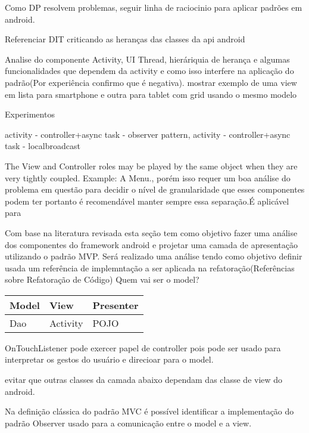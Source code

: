 
\if

Como DP resolvem problemas, seguir linha de raciocinio para aplicar padrões em
android.

Referenciar DIT criticando as heranças das classes da api android


Analise do componente Activity, UI Thread, hieráriquia de herança e algumas
funcionalidades que dependem da activity e como isso interfere na aplicação do
padrão(Por experiência confirmo que é negativa). mostrar exemplo de uma view em
lista para smartphone e outra para tablet com grid usando o mesmo modelo

Experimentos


activity - controller+async task - observer pattern,
activity - controller+async task - localbroadcast



 The View and Controller roles may be played by the 
same object when they are very tightly coupled. Example: A Menu., porém isso
requer um boa análise do problema em questão para decidir o nível de
granularidade que esses componentes podem ter portanto é recomendável manter
sempre essa separação.É aplicável para 

Com base na literatura revisada esta seção tem como objetivo fazer uma análise
dos componentes do framework android e projetar uma camada de apresentação
utilizando o padrão MVP. Será realizado uma análise  tendo como objetivo definir
usada um referência de implemntação a ser aplicada na refatoração(Referências
sobre Refatoração de Código)
Quem vai ser o model?

\begin{center}
\begin{tabular}{ | l | l | l | }
  \hline                        
  	Model & View & Presenter \\  \hline
  	Dao & Activity & POJO \\  \hline
\end{tabular}
\end{center}


OnTouchListener pode exercer papel de controller pois
pode ser usado para interpretar os gestos do usuário e direcioar para o model.

evitar que outras classes da camada abaixo dependam das classe de view do
android.

Na definição clássica do padrão MVC é possível identificar a implementação do
padrão Observer usado para a comunicação entre o model e a view.

